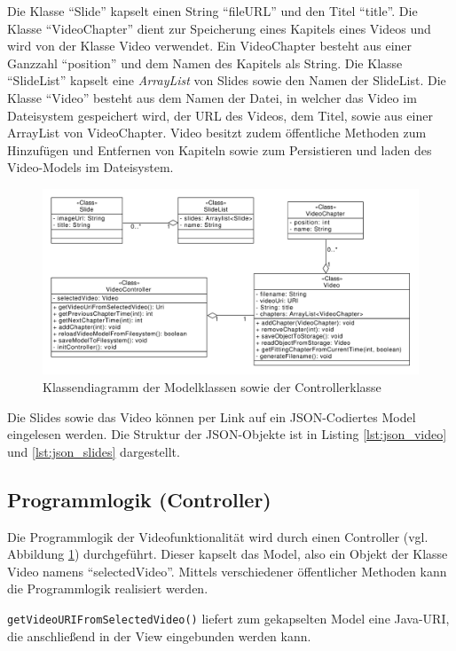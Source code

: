 Die Klasse \enquote{Slide} kapselt einen String \enquote{fileURL} und den Titel \enquote{title}. 
Die Klasse \enquote{VideoChapter} dient zur Speicherung eines Kapitels eines Videos und wird von der Klasse Video verwendet. Ein VideoChapter besteht aus einer Ganzzahl \enquote{position} und dem Namen des Kapitels als String. Die Klasse \enquote{SlideList} kapselt eine \emph{ArrayList} von Slides sowie den Namen der SlideList.
Die Klasse \enquote{Video} besteht aus dem Namen der Datei, in welcher das Video im Dateisystem gespeichert wird, der URL des Videos, dem Titel, sowie aus einer ArrayList von VideoChapter. Video besitzt zudem öffentliche Methoden zum Hinzufügen und Entfernen von Kapiteln sowie zum Persistieren und laden des Video-Models im Dateisystem.
\begin{figure}[htbp]
    \centering
    \includegraphics[width=1\textwidth]{data/bilder/Klassendiagramm.pdf}
    \caption{Klassendiagramm der Modelklassen sowie der Controllerklasse}
    \label{fig:Klassendiagramm}
\end{figure}

Die Slides sowie das Video können per Link auf ein JSON-Codiertes Model eingelesen werden. Die Struktur der JSON-Objekte ist in Listing \ref{lst:json_video} und \ref{lst:json_slides} dargestellt.
%
%
%
%
%
%
\subsection{Programmlogik (Controller)}
Die Programmlogik der Videofunktionalität wird durch einen Controller (vgl. Abbildung \ref{fig:Klassendiagramm}) durchgeführt. Dieser kapselt das Model, also ein Objekt der Klasse Video namens \enquote{selectedVideo}. Mittels verschiedener öffentlicher Methoden kann die Programmlogik realisiert werden. 

\texttt{getVideoURIFromSelectedVideo()} liefert zum gekapselten Model eine Java-URI, die anschließend in der View eingebunden werden kann.

